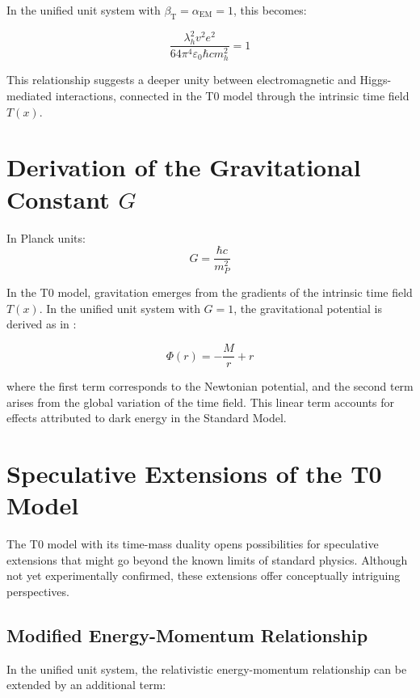 \documentclass[12pt,a4paper]{article}
\newcommand{\Tfield}{T(x)}
\newcommand{\betaT}{\beta_{\text{T}}}
\newcommand{\alphaEM}{\alpha_{\text{EM}}}
\begin{document}
	In the unified unit system with \(\betaT = \alphaEM = 1\), this becomes:
	
	\begin{equation}
		\frac{\lambda_h^2 v^2 e^2}{64\pi^4\varepsilon_0\hbar c m_h^2} = 1
	\end{equation}
	
	This relationship suggests a deeper unity between electromagnetic and Higgs-mediated interactions, connected in the T0 model through the intrinsic time field \(\Tfield\).
	
	\section{Derivation of the Gravitational Constant \(G\)}
	
	In Planck units:
	\begin{equation}
		G = \frac{\hbar c}{m_P^2}
	\end{equation}
	
	In the T0 model, gravitation emerges from the gradients of the intrinsic time field \(\Tfield\). In the unified unit system with \(G = 1\), the gravitational potential is derived as in \cite{pascher_emergente_gravitation_2025}:
	
	\begin{equation}
		\Phi(r) = -\frac{M}{r} + r
	\end{equation}
	
	where the first term corresponds to the Newtonian potential, and the second term arises from the global variation of the time field. This linear term accounts for effects attributed to dark energy in the Standard Model.
	
	\section{Speculative Extensions of the T0 Model}
	
	The T0 model with its time-mass duality opens possibilities for speculative extensions that might go beyond the known limits of standard physics. Although not yet experimentally confirmed, these extensions offer conceptually intriguing perspectives.
	
	\subsection{Modified Energy-Momentum Relationship}
	
	In the unified unit system, the relativistic energy-momentum relationship can be extended by an additional term:
	
\end{document}
